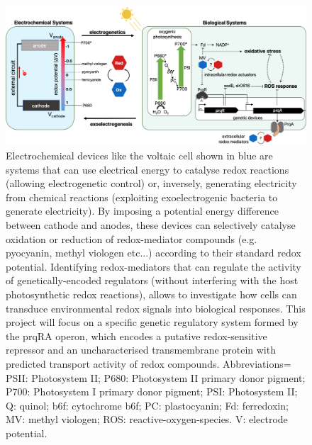 \begin{figure}[H]
    \centering
    \includegraphics[width=\hsize]{figs/fintro.png}
    \caption{Electrochemical devices like the voltaic cell shown in blue are systems that can use electrical energy to catalyse redox reactions (allowing electrogenetic control) or, inversely, generating electricity from chemical reactions (exploiting exoelectrogenic bacteria to generate electricity). By imposing a potential energy difference between cathode and anodes, these devices can selectively catalyse oxidation or reduction of redox-mediator compounds (e.g. pyocyanin, methyl viologen etc...) according to their standard redox potential. Identifying redox-mediators that can regulate the activity of genetically-encoded regulators (without interfering with the host photosynthetic redox reactions),  allows to investigate how cells can transduce environmental redox signals into biological responses. This project will focus on a specific genetic regulatory system formed by the prqRA operon, which encodes a putative redox-sensitive repressor and an uncharacterised transmembrane protein with predicted transport activity of redox compounds. Abbreviations= PSII: Photosystem II; P680: Photosystem II primary donor pigment; P700: Photosystem I primary donor pigment; PSI: Photosystem II; Q: quinol; b6f: cytochrome b6f; PC: plastocyanin; Fd: ferredoxin; MV: methyl viologen; ROS: reactive-oxygen-species. V: electrode potential.}
\end{figure}


